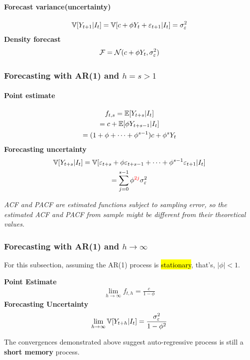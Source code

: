 \documentclass[11pt]{article}
\begin{document}
			\paragraph{Forecast variance(uncertainty)}
				\begin{gather}
					\mathbb{V}[{Y_{t+1}|I_t}] = \mathbb{V}[{c + \phi Y_t + \varepsilon_{t+1}|I_t}]
					= \sigma_\varepsilon^2
				\end{gather}
			\textbf{Density forecast}
				\begin{gather}
					\mathcal{{F}} = \mathcal{{N}}(c + \phi Y_t, \sigma_\varepsilon^2)
				\end{gather}
				
		\subsubsection{Forecasting with AR(1) and $h=s>1$}
			\paragraph{Point estimate}
				\begin{gather}
					f_{t,s} = \mathbb{E}[{Y_{t+s}|I_t}] \\
					= c + \mathbb{E}[{\phi Y_{t+s-1}|I_t}] \\
					= (1 + \phi + \dots + \phi^{s-1}) c + \phi^s Y_t
				\end{gather}
			\textbf{Forecasting uncertainty}
				\begin{gather}
					\mathbb{V}[{Y_{t+s}|I_t}] = \mathbb{V}[{\varepsilon_{t+s} + \phi \varepsilon_{t+s-1} + \dots + \phi^{s-1} \varepsilon_{t+1} | I_t}] \\
					= \sum_{j=0}^{s-1} \phi^{\textcolor{red}{2j}} \sigma_\varepsilon^2
				\end{gather}
			\begin{remark}
				\emph{ACF and PACF are estimated functions subject to sampling error, so the estimated ACF and PACF from sample might be different from their theoretical values.}
			\end{remark}
		\subsubsection{Forecasting with AR(1) and $h \to \infty$}
			\begin{assumption}
				For this subsection, assuming the AR(1) process is \hl{stationary}, that's, $|\phi| < 1$.
			\end{assumption}
			\textbf{Point Estimate}
				\begin{gather}
					\lim_{h \to \infty} f_{t, h} = \frac{c}{1 - \phi}
				\end{gather}
			\textbf{Forecasting Uncertainty}
				\begin{gather}
					\lim_{h \to \infty} \mathbb{V}[{Y_{t+h}|I_t}] = \frac{\sigma_\varepsilon^2}{1 - \phi^2}
				\end{gather}
			\begin{remark}
				The convergences demonstrated above suggest auto-regressive process is still a \textbf{short memory} process.
			\end{remark}
			
\end{document}

